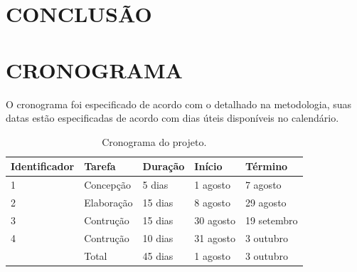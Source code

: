 \documentclass{article}
\begin{document}
\section{CONCLUSÃO}

\section{CRONOGRAMA}

O cronograma foi especificado de acordo com o detalhado na metodologia, suas datas estão especificadas de acordo com dias úteis disponíveis no calendário.


\begin{table}[!htbp]
    \begin{center}
        \begin{tabular}{ | l | l | l | l | l |}
            \hline
            \textbf{Identificador}& \textbf{Tarefa} &  \textbf{Duração} & \textbf{Início} & \textbf{Término} \\  \hline
            1 & Concepção & 5 dias & 1 agosto & 7 agosto \\  \hline
            2 & Elaboração & 15 dias & 8 agosto & 29 agosto \\  \hline
            3 & Contrução & 15 dias & 30 agosto & 19 setembro \\  \hline
            4 & Contrução & 10 dias & 31 agosto & 3 outubro \\ \hline
              & Total & 45 dias & 1 agosto & 3 outubro \\
            \hline
        \end{tabular}
    \end{center}
    \caption{Cronograma do projeto. \label{fig:Cordova}}
\end{table}

\newpage
\end{document}
